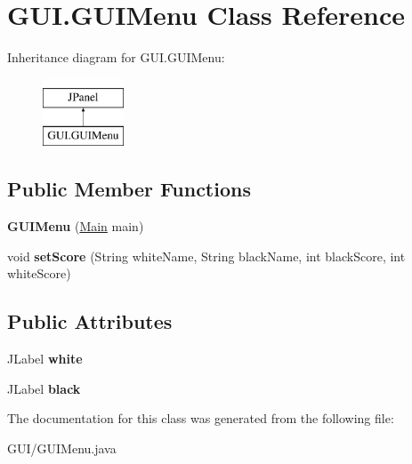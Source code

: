 \hypertarget{class_g_u_i_1_1_g_u_i_menu}{}\section{G\+U\+I.\+G\+U\+I\+Menu Class Reference}
\label{class_g_u_i_1_1_g_u_i_menu}
Inheritance diagram for G\+U\+I.\+G\+U\+I\+Menu\+:\begin{figure}[H]
\begin{center}
\leavevmode
\includegraphics[height=2.000000cm]{class_g_u_i_1_1_g_u_i_menu}
\end{center}
\end{figure}
\subsection*{Public Member Functions}
\begin{DoxyCompactItemize}
\item 
\mbox{\label{class_g_u_i_1_1_g_u_i_menu_a3b45d110394a3f206e2b559ee21fdf36}} 
{\bfseries G\+U\+I\+Menu} (\mbox{\hyperlink{class_g_u_i_1_1_main}{Main}} main)
\item 
\mbox{\label{class_g_u_i_1_1_g_u_i_menu_a5591425611de8bef9f7d8e08f07df713}} 
void {\bfseries set\+Score} (String white\+Name, String black\+Name, int black\+Score, int white\+Score)
\end{DoxyCompactItemize}
\subsection*{Public Attributes}
\begin{DoxyCompactItemize}
\item 
\mbox{\label{class_g_u_i_1_1_g_u_i_menu_a3dd67b46f7aa24b23a605fa542459433}} 
J\+Label {\bfseries white}
\item 
\mbox{\label{class_g_u_i_1_1_g_u_i_menu_a0f6d24966fb59fc6521f1d0db2af68f4}} 
J\+Label {\bfseries black}
\end{DoxyCompactItemize}


The documentation for this class was generated from the following file\+:\begin{DoxyCompactItemize}
\item 
G\+U\+I/G\+U\+I\+Menu.\+java\end{DoxyCompactItemize}

